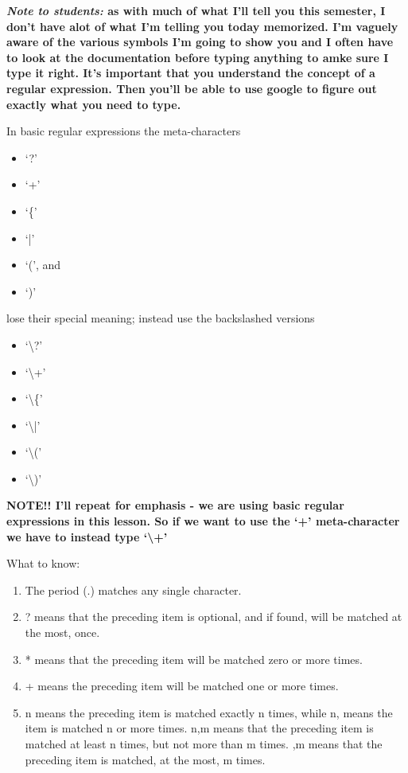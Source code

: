 \documentclass[12pt,a4paper]{article}
\begin{document}
{\Large\textbf{\textit{Note to students:} as with much of what I'll tell you this
semester, I don't have alot of what I'm telling you today memorized. I'm vaguely
aware of the various symbols I'm going to show you and I often have to look at
the documentation before typing anything to amke sure I type it right. It's
important that you understand the concept of a regular expression. Then you'll
be able to use google to figure out exactly what you need to type.}}

In basic regular expressions the meta-characters
\begin{itemize}
\item `?'
\item `+'
\item `\{'
\item `|'
\item `(', and
\item `)'
\end{itemize}

 lose their special meaning; instead use the backslashed versions

\begin{itemize}
\item `\textbackslash?'
\item `\textbackslash+'
\item `\textbackslash\{'
\item `\textbackslash|'
\item `\textbackslash('
\item `\textbackslash)'
\end{itemize}

{\LARGE\textbf{NOTE!! I'll repeat for emphasis - we are using basic regular
expressions in this lesson. So if we want to use the `+' meta-character we have
to instead type `\textbackslash+'}}

What to know:
\begin{enumerate}
\item The period (.) matches any single character.
\item ? means that the preceding item is optional, and if found, will be matched at the most, once.
\item * means that the preceding item will be matched zero or more times.
\item + means the preceding item will be matched one or more times.
\item {n} means the preceding item is matched exactly n times, while {n,} means the item is matched n or more times. {n,m} means that the preceding item is matched at least n times, but not more than m times. {,m} means that the preceding item is matched, at the most, m times.
\end{enumerate}
\end{document}
